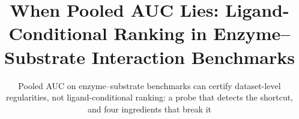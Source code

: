 \title{When Pooled AUC Lies: Ligand-Conditional Ranking in Enzyme--Substrate Interaction Benchmarks}
\subtitle{Pooled AUC on enzyme--substrate benchmarks can certify dataset-level regularities, not ligand-conditional ranking: a probe that detects the shortcut, and four ingredients that break it}


